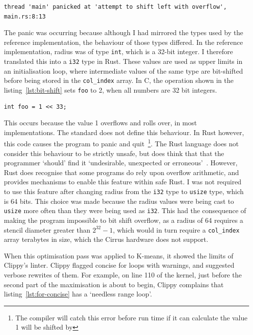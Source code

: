 \begin{code}
\begin{verbatim}
thread 'main' panicked at 'attempt to shift left with overflow', main.rs:8:13
\end{verbatim}
\label{lst:rutsc-bit}
\end{code}

The panic was occurring because although I had mirrored the types used by the reference implementation, the behaviour of those types differed. In the reference implementation, radius was of type \texttt{int}, which is a 32-bit integer. I therefore translated this into a \texttt{i32} type in Rust. These values are used as upper limits in an initialisation loop, where intermediate values of the same type are bit-shifted before being stored in the \texttt{col\_index} array. In C, the operation shown in the listing~\ref{lst:bit-shift} sets \texttt{foo} to 2, when all numbers are 32 bit integers. 
\begin{code}
\begin{verbatim}
int foo = 1 << 33;
\end{verbatim}
\label{lst:bit-shift}
\end{code}

This occurs because the value 1 overflows and rolls over, in most implementations. The standard does not define this behaviour. In Rust however, this code causes the program to panic and quit~\footnote{The compiler will catch this error before run time if it can calculate the value 1 will be shifted by}. The Rust language does not consider this behaviour to be strictly unsafe, but does think that that the programmer `should' find it `undesirable, unexpected or erroneous'~\cite{rustunsafe}.
However, Rust does recognise that some programs do rely upon overflow arithmetic, and provides mechanisms to enable this feature within safe Rust. I was not required to use this feature after changing radius from the \texttt{i32} type to \texttt{usize} type, which is 64 bits.
This choice was made because the radius values were being cast to \texttt{usize} more often than they were being used as \texttt{i32}. This had the consequence of making the program impossible to bit shift overflow, as a radius of 64 requires a stencil diameter greater than $2^{32}-1$, which would in turn require a \texttt{col\_index} array terabytes in size, which the Cirrus hardware does not support.

When this optimisation pass was applied to K-means, it showed the limits of Clippy's linter. Clippy flagged concise for loops with warnings, and suggested verbose rewrites of them. For example, on line 110 of the kernel, just before the second part of the maximisation is about to begin, Clippy complains that listing~\ref{lst:for-concise} has a `needless range loop'.

